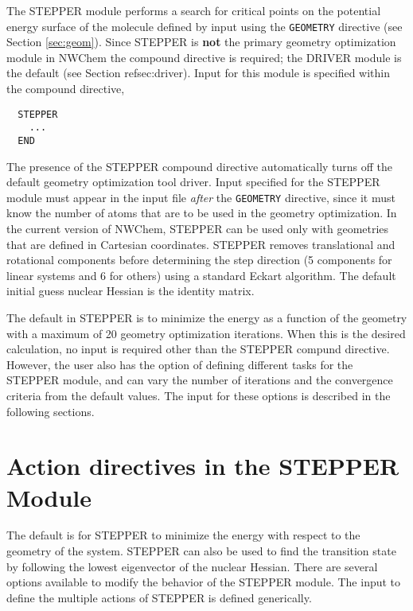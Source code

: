 \label{sec:stepper}

The STEPPER module performs a search for critical points on the
potential energy surface of the molecule defined by input using the
\verb+GEOMETRY+ directive (see Section \ref{sec:geom}).  Since STEPPER
is {\bf not} the primary geometry optimization module in NWChem the
compound directive is required; the DRIVER module is the default (see
Section {\LARGE ref{sec:driver}}).  Input for this module is
specified within the compound directive,

\begin{verbatim}
  STEPPER
    ...
  END
\end{verbatim}

The presence of the STEPPER compound directive automatically turns off
the default geometry optimization tool driver. Input specified for the
STEPPER module must appear in the input file {\em after} the
\verb+GEOMETRY+ directive, since it must know the number of atoms that
are to be used in the geometry optimization.  In the current version
of NWChem, STEPPER can be used only with geometries that are defined
in Cartesian coordinates.  STEPPER removes translational and
rotational components before determining the step direction (5
components for linear systems and 6 for others) using a standard
Eckart algorithm.  The default initial guess nuclear Hessian is the
identity matrix.

The default in STEPPER is to minimize the energy as a function of the
geometry with a maximum of 20 geometry optimization iterations.  When
this is the desired calculation, no input is required other than the
STEPPER compund directive.  However, the user also has the option of
defining different tasks for the STEPPER module, and can vary the
number of iterations and the convergence criteria from the default
values.  The input for these options is described in the following
sections.

\section{Action directives in the STEPPER Module}

The default is for STEPPER to minimize the energy with respect to the
geometry of the system.  STEPPER can also be used to find the
transition state by following the lowest eigenvector of the nuclear
Hessian.  There are several options available to modify the behavior
of the STEPPER module.  The input to define the multiple actions of
STEPPER is defined generically. 

